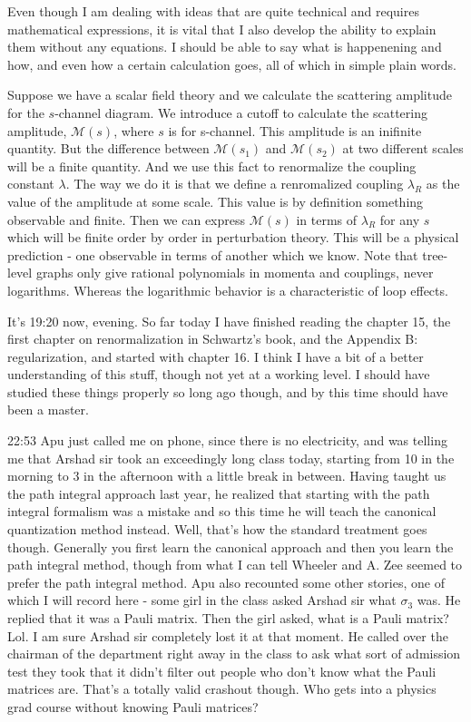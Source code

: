\documentclass[11pt,a4paper]{article}
\begin{document}
Even though I am dealing with ideas that are quite technical and requires mathematical expressions, it is vital that I also develop the ability to explain them without any equations. I should be able to say what is happenening and how, and even how a certain calculation goes, all of which in simple plain words.

Suppose we have a scalar field theory and we calculate the scattering amplitude for the $s$-channel diagram. We introduce a cutoff to calculate the scattering amplitude, $\mathcal{M}(s) $, where $s$ is for s-channel. This amplitude is an inifinite quantity. But the difference between $\mathcal{M}(s_1)$ and $\mathcal{M}(s_2)$ at two different scales will be a finite quantity. And we use this fact to renormalize the coupling constant $\lambda$. The way we do it is that we define a renromalized coupling $\lambda _R$ as the value of the amplitude at some scale. This value is by definition something observable and finite. Then we can express $\mathcal{M}(s)$ in terms of $\lambda_R$ for any $s$ which will be finite order by order in perturbation theory. This will be a physical prediction - one observable in terms of another which we know. Note that tree-level graphs only give rational polynomials in momenta and couplings, never logarithms. Whereas the logarithmic behavior is a characteristic of loop effects. 

It's 19:20 now, evening. So far today I have finished reading the chapter 15, the first chapter on renormalization in Schwartz's book, and the Appendix B: regularization, and started with chapter 16. I think I have a bit of a better understanding of this stuff, though not yet at a working level. I should have studied these things properly so long ago though, and by this time should have been a master. 

22:53 Apu just called me on phone, since there is no electricity, and was telling me that Arshad sir took an exceedingly long class today, starting from 10 in the morning to 3 in the afternoon with a little break in between. Having taught us the path integral approach last year, he realized that starting with the path integral formalism was a mistake and so this time he will teach the canonical quantization method instead. Well, that's how the standard treatment goes though. Generally you first learn the canonical approach and then you learn the path integral method, though from what I can tell Wheeler and A. Zee seemed to prefer the path integral method. Apu also recounted some other stories, one of which I will record here - some girl in the class asked Arshad sir what $\sigma _3$ was. He replied that it was a Pauli matrix. Then the girl asked, what is a Pauli matrix? Lol. I am sure Arshad sir completely lost it at that moment. He called over the chairman of the department right away in the class to ask what sort of admission test they took that it didn't filter out people who don't know what the Pauli matrices are. That's a totally valid crashout though. Who gets into a physics grad course without knowing Pauli matrices? 
\end{document}
